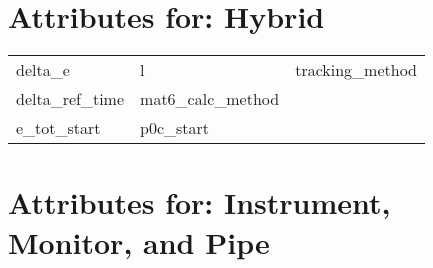 \section{Attributes for: Hybrid}
 \label{s:list.hybrid}
 
 \begin{tabular}{lll} \toprule
delta_e                     & l                           & tracking_method             \\
delta_ref_time              & mat6_calc_method            &                             \\
e_tot_start                 & p0c_start                   &                             \\
 \bottomrule
 \end{tabular}
 \vfill
 
 \section{Attributes for: Instrument, Monitor, and Pipe}
 \label{s:list.instrument}
 
